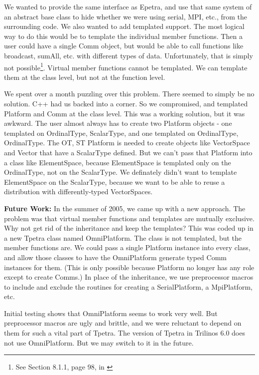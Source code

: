 \documentclass[10pt,relax]{TpetraDesign}
\begin{document}
We wanted to provide the same interface as Epetra, and use that same system of an abstract base class to hide whether we were using serial, MPI, etc., from the surrounding code. We also wanted to add templated support. The most logical way to do this would be to template the individual member functions. Then a user could have a single Comm object, but would be able to call functions like broadcast, sumAll, etc. with different types of data. Unfortunately, that is simply not possible\footnote{See Section 8.1.1, page 98, in \cite{Templates-Complete-Guide}}. Virtual member functions cannot be templated. We can template them at the class level, but not at the function level.

We spent over a month puzzling over this problem. There seemed to simply be no solution. C++ had us backed into a corner. So we compromised, and templated Platform and Comm at the class level. This was a working solution, but it was awkward. The user almost always has to create two Platform objects - one templated on OrdinalType, ScalarType, and one templated on OrdinalType, OrdinalType. The OT, ST Platform is needed to create objects like VectorSpace and Vector that have a ScalarType defined. But we can't pass that Platform into a class like ElementSpace, because ElementSpace is templated only on the OrdinalType, not on the ScalarType. We definately didn't want to template ElementSpace on the ScalarType, because we want to be able to reuse a distribution with differently-typed VectorSpaces.

\textbf{Future Work:} In the summer of 2005, we came up with a new approach. The problem was that virtual member functions and templates are mutually exclusive. Why not get rid of the inheritance and keep the templates? This was coded up in a new Tpetra class named OmniPlatform. The class is not templated, but the member functions are. We could pass a single Platform instance into every class, and allow those classes to have the OmniPlatform generate typed Comm instances for them. (This is only possible because Platform no longer has any role except to create Comms.) In place of the inheritance, we use preprocessor macros to include and exclude the routines for creating a SerialPlatform, a MpiPlatform, etc. 

Initial testing shows that OmniPlatform seems to work very well. But preprocessor macros are ugly and brittle, and we were reluctant to depend on them for such a vital part of Tpetra. The version of Tpetra in Trilinos 6.0 does not use OmniPlatform. But we may switch to it in the future.
\end{document}
